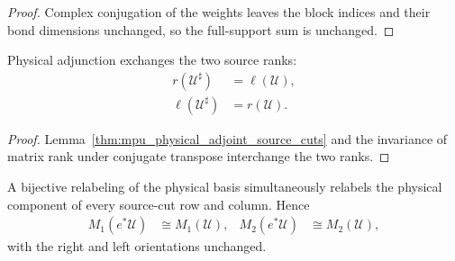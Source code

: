 \begin{proof}\leanok
    Complex conjugation of the weights leaves the block indices and their bond
    dimensions unchanged, so the full-support sum is unchanged.
\end{proof}


\begin{lemma}
    \label{thm:mpu_physical_adjoint_source_ranks}
    \leanok
    Physical adjunction exchanges the two source ranks:
    \begin{align}
        r(\mathcal U^\sharp)    & =\ell(\mathcal U), \\
        \ell(\mathcal U^\sharp) & =r(\mathcal U).
    \end{align}
\end{lemma}

\begin{proof}\leanok
    Lemma~\ref{thm:mpu_physical_adjoint_source_cuts} and the invariance
    of matrix rank under conjugate transpose interchange the two ranks.
\end{proof}

\begin{lemma}
    \label{thm:mpu_source_cuts_physical_reindexing}
    \leanok
    A bijective relabeling of the physical basis simultaneously relabels the
    physical component of every source-cut row and column. Hence
    \begin{align}
        M_1(e^*\mathcal U) & \cong M_1(\mathcal U),
                           & M_2(e^*\mathcal U)     & \cong M_2(\mathcal U),
    \end{align}
    with the right and left orientations unchanged.
\end{lemma}

